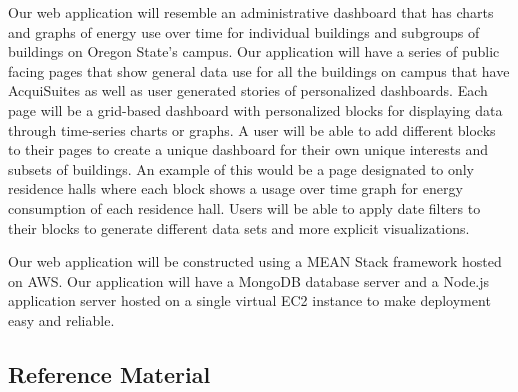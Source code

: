 \documentclass[journal,10pt,onecolumn,compsoc]{IEEEtran}
\begin{document}
    \noindent Our web application will resemble an administrative dashboard that has charts and graphs of energy use over time for individual buildings and subgroups of buildings on Oregon State's campus. 
    Our application will have a series of public facing pages that show general data use for all the buildings on campus that have AcquiSuites as well as user generated stories of personalized dashboards. Each page will be a grid-based dashboard with personalized blocks for displaying data through time-series charts or graphs. A user will be able to add different blocks to their pages to create a unique dashboard for their own unique interests and subsets of buildings. An example of this would be a page designated to only residence halls where each block shows a usage over time graph for energy consumption of each residence hall. Users will be able to apply date filters to their blocks to generate different data sets and more explicit visualizations.

    \noindent Our web application will be constructed using a MEAN Stack framework hosted on AWS. Our application will have a MongoDB database server and a Node.js application server hosted on a single virtual EC2 instance to make deployment easy and reliable.
   
    \subsection{Reference Material}
\end{document}

